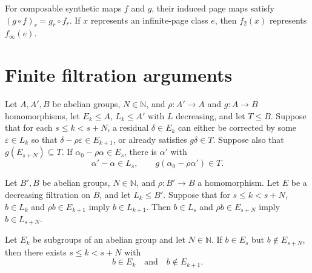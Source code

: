\begin{theorem}
\label{sem:ProofTools:page-naturality}
For composable synthetic maps $f$ and $g$, their induced page maps satisfy $(g\circ f)_r=g_r\circ f_r$. If $x$ represents an infinite-page class $e$, then $f_2(x)$ represents $f_\infty(e)$.
\end{theorem}

\section{Finite filtration arguments}


\begin{theorem}
\label{sem:ProofTools:finite-correction}
Let $A,A',B$ be abelian groups, $N\in\mathbb N$, and $\rho:A'\to A$ and $g:A\to B$ homomorphisms, let $E_k\leq A$, $L_k\leq A'$ with $L$ decreasing, and let $T\leq B$. Suppose that for each $s\leq k<s+N$, a residual $\delta\in E_k$ can either be corrected by some $\varepsilon\in L_k$ so that $\delta-\rho\varepsilon\in E_{k+1}$, or already satisfies $g\delta\in T$. Suppose also that $g(E_{s+N})\subseteq T$. If $\alpha_0-\rho\alpha\in E_s$, there is $\alpha'$ with
\[\alpha'-\alpha\in L_s,\qquad g(\alpha_0-\rho\alpha')\in T.\]

\end{theorem}

\begin{theorem}
\label{sem:ProofTools:finite-reflection}
Let $B',B$ be abelian groups, $N\in\mathbb N$, and $\rho:B'\to B$ a homomorphism. Let $E$ be a decreasing filtration on $B$, and let $L_k\leq B'$. Suppose that for $s\leq k<s+N$, $b\in L_k$ and $\rho b\in E_{k+1}$ imply $b\in L_{k+1}$. Then $b\in L_s$ and $\rho b\in E_{s+N}$ imply $b\in L_{s+N}$.
\end{theorem}

\begin{theorem}
\label{sem:ProofTools:leading-grade}
Let $E_k$ be subgroups of an abelian group and let $N\in\mathbb N$. If $b\in E_s$ but $b\notin E_{s+N}$, then there exists $s\leq k<s+N$ with
\[b\in E_k\quad\text{and}\quad b\notin E_{k+1}.\]

\end{theorem}

